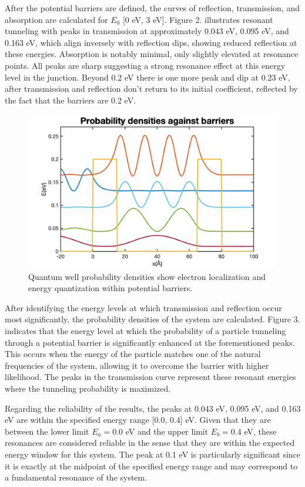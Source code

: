 \documentclass[twocolumn]{article}[ht]
\begin{document}
After the potential barriers are defined, the curves of reflection, transmission, and absorption are calculated for $E_0$  [0 eV, 3 eV]. Figure 2. illustrates resonant tunneling with peaks in transmission at approximately 0.043 eV, 0.095 eV, and 0.163 eV, which align inversely with reflection dips, showing reduced reflection at these energies. Absorption is notably minimal, only slightly elevated at resonance points. All peaks are sharp suggesting a strong resonance effect at this energy level in the junction. Beyond 0.2 eV there is one more peak and dip at 0.23 eV, after transmission and reflection don't return to its initial coefficient, reflected by the fact that the barriers are 0.2 eV.
\begin{figure}[ht]
    \centering
    \includegraphics[width=0.9\linewidth]{prob_density.png}
    \caption{Quantum well probability densities show electron localization and energy quantization within potential barriers.}
    \label{fig:example-3}
\end{figure}

After identifying the energy levels at which transmission and reflection occur most significantly, the probability densities of the system are calculated. Figure 3. indicates that the energy level at which the probability of a particle tunneling through a potential barrier is significantly enhanced at the forementioned peaks. This occurs when the energy of the particle matches one of the natural frequencies of the system, allowing it to overcome the barrier with higher likelihood. The peaks in the transmission curve represent these resonant energies where the tunneling probability is maximized.

Regarding the reliability of the results, the peaks at 0.043 eV, 0.095 eV, and 0.163 eV are within the specified energy range [0.0, 0.4] eV. Given that they are between the lower limit \(E_a = 0.0\) eV and the upper limit \(E_b = 0.4\) eV, these resonances are considered reliable in the sense that they are within the expected energy window for this system. The peak at 0.1 eV is particularly significant since it is exactly at the midpoint of the specified energy range and may correspond to a fundamental resonance of the system.
\end{document}
